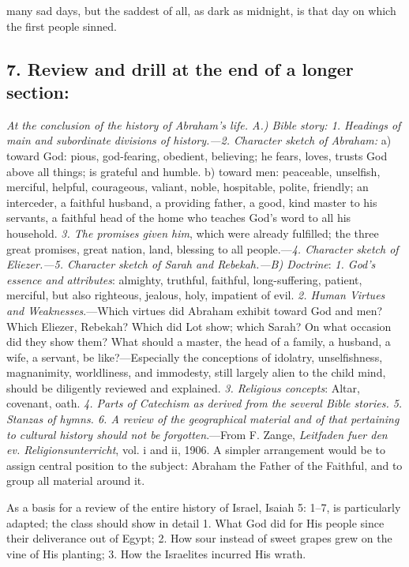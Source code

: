 many sad days, but the saddest of all, as dark as midnight, is that day on which the first people sinned.

\subsection[7. Review and drill]{7. Review and drill at the end of a longer section:}

\emph{At the conclusion of the history of Abraham’s life. A.) Bible story: 1. Headings of main and subordinate divisions of history.—2. Character sketch of Abraham:} a) toward God: pious, god-fearing, obedient, believing; he fears, loves, trusts God above all things; is grateful and humble. b) toward men: peaceable, unselfish, merciful, helpful, courageous, valiant, noble, hospitable, polite, friendly; an interceder, a faithful husband, a providing father, a good, kind master to his servants, a faithful head of the home who teaches God’s word to all his household. \emph{3. The promises given him}, which were already fulfilled; the three great promises, great nation, land, blessing to all people.—\emph{4. Character sketch of Eliezer.—5. Character sketch of Sarah and Rebekah.—B) Doctrine}: \emph{1. God’s essence and attributes}: almighty, truthful, faithful, long-suffering, patient, merciful, but also righteous, jealous, holy, impatient of evil. \emph{2. Human Virtues and Weaknesses}.—Which virtues did Abraham exhibit toward God and men? Which Eliezer, Rebekah? Which did Lot show; which Sarah? On what occasion did they show them? What should a master, the head of a family, a husband, a wife, a servant, be like?—Especially the conceptions of idolatry, unselfishness, magnanimity, worldliness, and immodesty, still largely alien to the child mind, should be diligently reviewed and explained. \emph{3. Religious concepts}: Altar, covenant, oath. \emph{4. Parts of Catechism as derived from the several Bible stories. 5. Stanzas of hymns. 6. A review of the geographical material and of that pertaining to cultural history should not be forgotten}.—From F. Zange, \emph{Leitfaden fuer den ev. Religionsunterricht}, vol. i and ii, 1906. A simpler arrangement would be to assign central position to the subject: Abraham the Father of the Faithful, and to group all material around it.

As a basis for a review of the entire history of Israel, Isaiah 5: 1–7, is particularly adapted; the class should show in detail 1. What God did for His people since their deliverance out of Egypt; 2. How sour instead of sweet grapes grew on the vine of His planting; 3. How the Israelites incurred His wrath.

